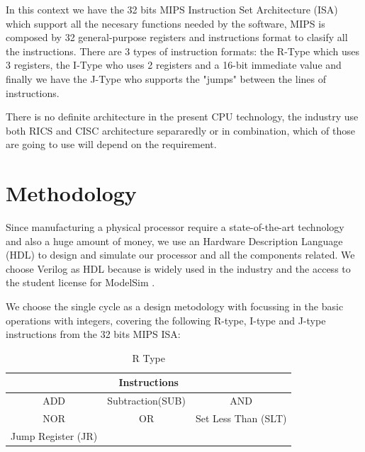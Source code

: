 \documentclass[conference]{IEEEtran}
\begin{document}
In this context we have the 32 bits MIPS Instruction Set Architecture (ISA) \cite{b1} which support all the necesary functions
needed by the software, MIPS is composed by 32 general-purpose registers and instructions format to clasify
all the instructions. There are 3 types of instruction formats: the R-Type which uses 3 registers, the I-Type who uses 2
registers and a 16-bit immediate value and finally we have the J-Type who supports the "jumps" between the lines of
instructions. 

There is no definite architecture in the present CPU technology, the industry use both RICS and CISC 
architecture separaredly or in combination, which of those are going to use will depend on the requirement.

\section{Methodology}	%

Since manufacturing a physical processor require a state-of-the-art technology and also a huge
amount of money, we use an Hardware Description Language (HDL) to design and simulate our
processor and all the components related. We choose Verilog \cite{b2} as HDL because is widely used in the 
industry and the access to the student license for ModelSim \cite{b3}.

We choose the single cycle as a design metodology with focussing in the basic operations with integers, 
covering the following R-type, I-type and J-type instructions from the 32 bits MIPS ISA:

\begin{table}[htbp]
\caption{R Type} %
\begin{center}
\begin{tabular}{|c|c|c|}
\hline
\multicolumn{3}{|c|}{\textbf{Instructions}} \\
\hline
ADD&Subtraction(SUB)&AND  \\
\hline
NOR&OR&Set Less Than (SLT) \\
\hline
Jump Register (JR)&& \\
\hline
\end{tabular}
\label{tab_rtype}
\end{center}
\end{table}
\end{document}
